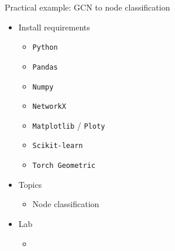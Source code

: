 \documentclass{beamer}
\begin{document}
        \begin{frame}{Practical example: GCN to node classification} 
            \begin{itemize}
                \item Install requirements
                    \begin{itemize}
                        \item \texttt{Python}
                        \item \texttt{Pandas}
                        \item \texttt{Numpy}
                        \item \texttt{NetworkX}
                        \item \texttt{Matplotlib} / \texttt{Ploty}
                        \item \texttt{Scikit-learn}
                        \item \texttt{Torch Geometric}
                    \end{itemize}
                \item Topics 
                    \begin{itemize}
                        \item Node classification
                    \end{itemize}
                \item Lab
                    \begin{itemize}
                        \item              
                            \href{https://drive.google.com/file/d/19ByHxX1AsqLiV3uqIoW5KLiuEDgCWdA5/view?usp=sharing}{
                            }
                    \end{itemize}
            \end{itemize}
        \end{frame}
\end{document}
